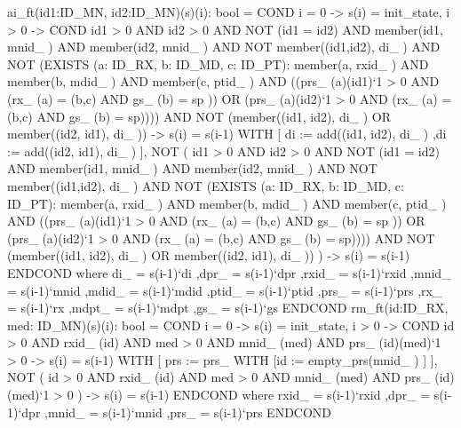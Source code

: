 \begin{pvs}

      ai_ft(id1:ID_MN, id2:ID_MN)(s)(i): bool = COND
          i = 0 -> s(i) = init_state,
          i > 0 -> COND
	  id1 > 0 AND id2 > 0
          AND NOT (id1 = id2)
	  AND member(id1, mnid_ )
	  AND member(id2, mnid_ )
	  AND NOT member((id1,id2), di_ )
          AND NOT (EXISTS (a: ID_RX, b: ID_MD, c: ID_PT): 
          member(a, rxid_ ) AND member(b, mdid_ ) 
          AND member(c, ptid_ ) AND ((prs_ (a)(id1)`1 > 0 
          AND (rx_ (a) = (b,c) AND gs_ (b) = sp )) 
	      OR (prs_ (a)(id2)`1 > 0 AND (rx_ (a) = (b,c) 
	      AND gs_ (b) = sp))))
   	 AND NOT (member((id1, id2), di_ )                                             
            OR member((id2, id1), di_ ))
	  -> s(i) = s(i-1) WITH [
              di := add((id1, id2), di_ )
              ,di := add((id2, id1), di_ )
          ],
          NOT (
            id1 > 0 AND id2 > 0
          AND NOT (id1 = id2)
          AND member(id1, mnid_ )
          AND member(id2, mnid_ )
          AND NOT member((id1,id2), di_ )
          AND NOT (EXISTS (a: ID_RX, b: ID_MD, c: ID_PT):
           member(a, rxid_ ) AND member(b, mdid_ ) 
           AND member(c, ptid_ ) AND ((prs_ (a)(id1)`1 > 0 
           AND (rx_ (a) = (b,c) AND gs_ (b) = sp ))
              OR (prs_ (a)(id2)`1 > 0 AND (rx_ (a) = (b,c) 
              AND gs_ (b) = sp))))
         AND NOT (member((id1, id2), di_ )
            OR member((id2, id1), di_ )) ) -> s(i) = s(i-1)
      ENDCOND
      where
        di_   = s(i-1)`di
        ,dpr_  = s(i-1)`dpr
	,rxid_ = s(i-1)`rxid
        ,mnid_ = s(i-1)`mnid
	,mdid_ = s(i-1)`mdid
	,ptid_ = s(i-1)`ptid
        ,prs_  = s(i-1)`prs
	,rx_ = s(i-1)`rx
	,mdpt_ = s(i-1)`mdpt
	,gs_ = s(i-1)`gs
	ENDCOND
      rm_ft(id:ID_RX, med: ID_MN)(s)(i): bool = COND
          i = 0 -> s(i) = init_state,
        i > 0 -> COND
	   id > 0
	  AND rxid_ (id)
	  AND med > 0
	  AND mnid_ (med)
	  AND prs_ (id)(med)`1 > 0
	  -> s(i) = s(i-1) WITH [
	    prs := prs_ WITH [id := empty_prs(mnid_ ) ]
	  ],
          NOT (
            id > 0
	    AND rxid_ (id)
            AND med > 0
            AND mnid_ (med)
            AND prs_ (id)(med)`1 > 0
          ) -> s(i) = s(i-1)
      ENDCOND
      where
         rxid_ = s(i-1)`rxid
        ,dpr_  = s(i-1)`dpr
        ,mnid_ = s(i-1)`mnid
        ,prs_  = s(i-1)`prs
	ENDCOND


\end{pvs}
